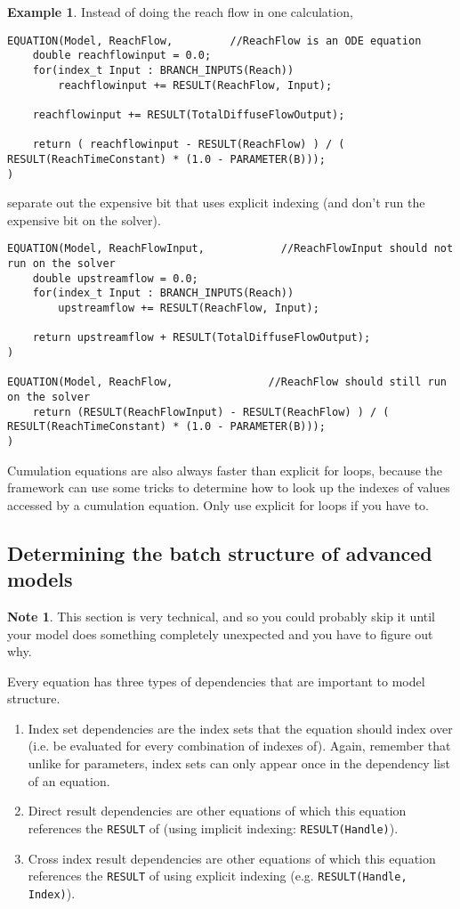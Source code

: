 \documentclass[11pt]{article}
\theoremstyle{definition}
\newtheorem{mynote}{Note}
\newenvironment{note}%
  {\begin{lrbox}{\notebox}%
   \begin{minipage}{\dimexpr\linewidth-2\fboxsep}
   \begin{mynote}}%
  {\end{mynote}%
   \end{minipage}%
   \end{lrbox}%
   \begin{trivlist}
     \item[]\colorbox{silver}{\usebox\notebox}
   \end{trivlist}}
\newtheorem{myexample}{Example}
\newenvironment{example}%
  {\begin{lrbox}{\examplebox}%
   \begin{minipage}{\dimexpr\linewidth-2\fboxsep}
   \begin{myexample}}%
  {\end{myexample}%
   \end{minipage}%
   \end{lrbox}%
   \begin{trivlist}
     \item[]\colorbox{silver}{\usebox\examplebox}
   \end{trivlist}}
\begin{document}
\begin{example}
Instead of doing the reach flow in one calculation,
\begin{lstlisting}[style=mycpp]
EQUATION(Model, ReachFlow,         //ReachFlow is an ODE equation
	double reachflowinput = 0.0;
	for(index_t Input : BRANCH_INPUTS(Reach))
		reachflowinput += RESULT(ReachFlow, Input);
	
	reachflowinput += RESULT(TotalDiffuseFlowOutput);	

	return ( reachflowinput - RESULT(ReachFlow) ) / ( RESULT(ReachTimeConstant) * (1.0 - PARAMETER(B)));
)
\end{lstlisting}
separate out the expensive bit that uses explicit indexing (and don't run the expensive bit on the solver).
\begin{lstlisting}[style=mycpp]
EQUATION(Model, ReachFlowInput,            //ReachFlowInput should not run on the solver
	double upstreamflow = 0.0;
	for(index_t Input : BRANCH_INPUTS(Reach))
		upstreamflow += RESULT(ReachFlow, Input);
	
	return upstreamflow + RESULT(TotalDiffuseFlowOutput);
)

EQUATION(Model, ReachFlow,               //ReachFlow should still run on the solver
	return (RESULT(ReachFlowInput) - RESULT(ReachFlow) ) / ( RESULT(ReachTimeConstant) * (1.0 - PARAMETER(B)));
)
\end{lstlisting}
\end{example}

Cumulation equations are also always faster than explicit for loops, because the framework can use some tricks to determine how to look up the indexes of values accessed by a cumulation equation. Only use explicit for loops if you have to.

\subsection{Determining the batch structure of advanced models}\label{sec:advancedbatchstructure}

\begin{note}
This section is very technical, and so you could probably skip it until your model does something completely unexpected and you have to figure out why.
\end{note}

Every equation has three types of dependencies that are important to model structure.
\begin{enumerate}[i]
\item Index set dependencies are the index sets that the equation should index over (i.e. be evaluated for every combination of indexes of). Again, remember that unlike for parameters, index sets can only appear once in the dependency list of an equation.
\item Direct result dependencies are other equations of which this equation references the {\tt RESULT} of (using implicit indexing: {\tt RESULT(Handle)}).
\item Cross index result dependencies are other equations of which this equation references the {\tt RESULT} of using explicit indexing (e.g. {\tt RESULT(Handle, Index)}).
\end{enumerate}
\end{document}
